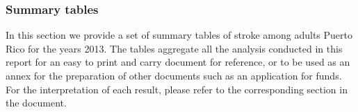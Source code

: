 \newpage
\subsubsection{Summary tables}
In this section we provide a set of summary tables of stroke among adults Puerto Rico for the years 2013. The tables aggregate all the analysis conducted in this report for an easy to print and carry document for reference, or to be used as an annex for the preparation of other documents such as an application for funds. For the interpretation of each result, please refer to the corresponding section in the document.


 
